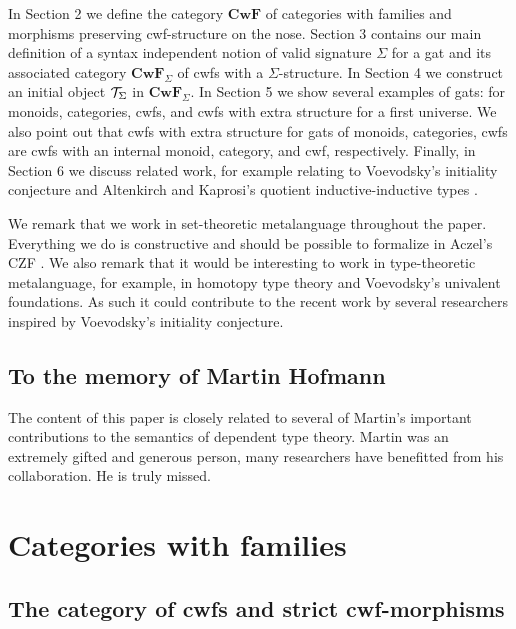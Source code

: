 \documentclass{lmcs}
\def\Cwf{\mathbf{CwF}}
\begin{document}
In Section 2 we define the category $\Cwf$ of categories with families and morphisms preserving cwf-structure on the nose. Section 3 contains our main definition of a syntax independent notion of valid signature $\Sigma$ for a gat and its associated category $\Cwf_\Sigma$ of cwfs with a $\Sigma$-structure. In Section 4 we construct an initial object ${\mathcal T}_\Sigma$ in $\Cwf_\Sigma$. In Section 5 we show several examples of gats: for monoids, categories, cwfs, and cwfs with extra structure for a first universe. We also point out that cwfs with extra structure for  gats of monoids, categories, cwfs are cwfs with an internal monoid, category, and cwf, respectively. Finally, in Section 6 we discuss related work, for example relating to Voevodsky's initiality conjecture \cite{voevodsky:initiality} and Altenkirch and Kaprosi's quotient inductive-inductive types \cite{altenkirch:qiits}.

We remark that we work in set-theoretic metalanguage throughout the paper. Everything we do is constructive and should be possible to formalize in Aczel's CZF \cite{AczelP:typtic}. We also remark that it would be interesting to work in type-theoretic metalanguage, for example, in homotopy type theory and Voevodsky's univalent foundations. As such it could contribute to the recent work by several researchers inspired by Voevodsky's initiality conjecture.

\subsection*{To the memory of Martin Hofmann}
The content of this paper  is closely related to several of Martin's
important contributions to the semantics of dependent type theory.
Martin was an extremely gifted and generous person, 
many researchers have benefitted from his collaboration.
He is truly missed.


\section{Categories with families}\label{sec:def_cwf}

\subsection{The category of cwfs and strict cwf-morphisms}

\end{document}
